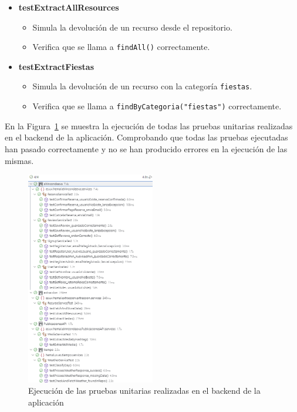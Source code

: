 \begin{itemize}
\begin{itemize}
  \item \textbf{testExtractAllResources}
  \begin{itemize}
    \item Simula la devolución de un recurso desde el repositorio.
    \item Verifica que se llama a \texttt{findAll()} correctamente.
  \end{itemize}

  \item \textbf{testExtractFiestas}
  \begin{itemize}
    \item Simula la devolución de un recurso con la categoría \texttt{fiestas}.
    \item Verifica que se llama a \texttt{findByCategoria("fiestas")} correctamente.
  \end{itemize}
\end{itemize}

  \end{itemize}

En la Figura~\ref{fig:pruebas-unitarias} se muestra la ejecución de todas las pruebas unitarias realizadas en el \gls{backend} de la aplicación. Comprobando que todas las pruebas ejecutadas han pasado correctamente y no se han producido errores en la ejecución de las mismas.

\begin{figure}[h!tb]
\centering
\includegraphics[width=0.5\textwidth]{figs/pruebas-unitarias.png}
\caption{Ejecución de las pruebas unitarias realizadas en el \gls{backend} de la aplicación}
\label{fig:pruebas-unitarias}
\end{figure}
